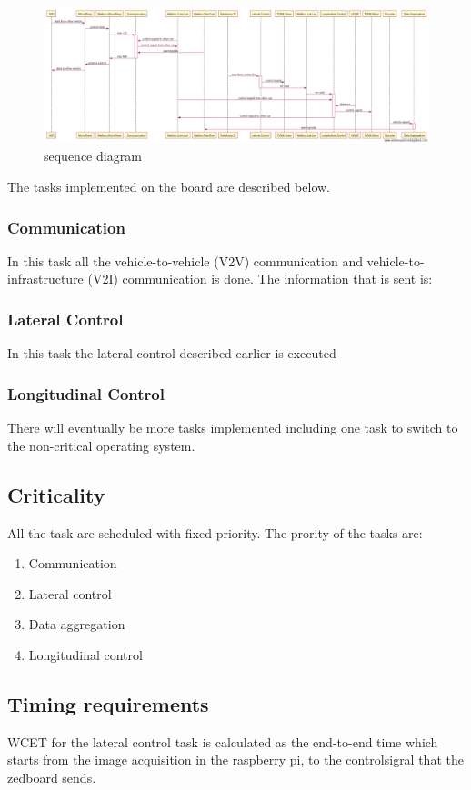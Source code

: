 \begin{figure}[H]
  \includegraphics[width=\textwidth]{./img/sekvensdiagram.png}
  \centering
  \caption{sequence diagram}
  \label{fig:sequence diagram}
\end{figure}
The tasks implemented on the board are described below.
 
\subsubsection{Communication}
In this task all the vehicle-to-vehicle (V2V) communication and vehicle-to-infrastructure (V2I) communication is done. The information that is sent is:
\subsubsection{Lateral Control}
In this task the lateral control described earlier is executed
\subsubsection{Longitudinal Control} 
 
 
There will eventually be more tasks implemented including one task to switch to the non-critical operating system.

\subsection{Criticality}
All the task are scheduled with fixed priority. The prority of the tasks are:


\begin{enumerate}
  \item Communication
  \item Lateral control
  \item Data aggregation
  \item Longitudinal control
\end{enumerate}



\subsection{Timing requirements}
WCET for the lateral control task is calculated as the end-to-end time which starts from the image acquisition in the raspberry pi, to the controlsigral that the zedboard sends. 